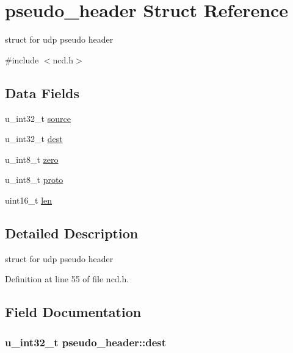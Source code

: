\hypertarget{structpseudo__header}{\section{pseudo\-\_\-header Struct Reference}
\label{structpseudo__header}
}


struct for udp pseudo header  




{\ttfamily \#include $<$ncd.\-h$>$}

\subsection*{Data Fields}
\begin{DoxyCompactItemize}
\item 
u\-\_\-int32\-\_\-t \hyperlink{structpseudo__header_ac1d63e2b666037057fba16b852c83549}{source}
\item 
u\-\_\-int32\-\_\-t \hyperlink{structpseudo__header_a825382766bd224e1ab209d7e1248efa8}{dest}
\item 
u\-\_\-int8\-\_\-t \hyperlink{structpseudo__header_a2a93c892eaf942dfb5c28a69c88f0ad7}{zero}
\item 
u\-\_\-int8\-\_\-t \hyperlink{structpseudo__header_acdb79cab7f361df75fe519e43e1db18c}{proto}
\item 
uint16\-\_\-t \hyperlink{structpseudo__header_a436e199ba010989dff88ba26ee6de668}{len}
\end{DoxyCompactItemize}


\subsection{Detailed Description}
struct for udp pseudo header 

Definition at line 55 of file ncd.\-h.



\subsection{Field Documentation}
\hypertarget{structpseudo__header_a825382766bd224e1ab209d7e1248efa8}{
\subsubsection[{dest}]{\setlength{\rightskip}{0pt plus 5cm}u\-\_\-int32\-\_\-t pseudo\-\_\-header\-::dest}}\label{structpseudo__header_a825382766bd224e1ab209d7e1248efa8}


